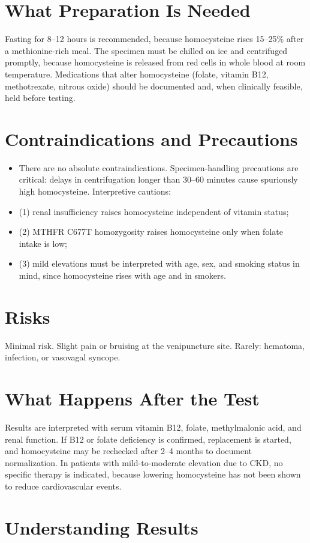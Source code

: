 \section*{What Preparation Is Needed}
Fasting for 8--12 hours is recommended, because homocysteine rises 15--25\% after a methionine-rich meal. The specimen must be chilled on ice and centrifuged promptly, because homocysteine is released from red cells in whole blood at room temperature. Medications that alter homocysteine (folate, vitamin B12, methotrexate, nitrous oxide) should be documented and, when clinically feasible, held before testing.
\section*{Contraindications and Precautions}
\begin{itemize}
  \item There are no absolute contraindications. Specimen-handling precautions are critical: delays in centrifugation longer than 30--60 minutes cause spuriously high homocysteine. Interpretive cautions:
  \item (1) renal insufficiency raises homocysteine independent of vitamin status;
  \item (2) MTHFR C677T homozygosity raises homocysteine only when folate intake is low;
  \item (3) mild elevations must be interpreted with age, sex, and smoking status in mind, since homocysteine rises with age and in smokers.
\end{itemize}
\section*{Risks}
Minimal risk. Slight pain or bruising at the venipuncture site. Rarely: hematoma, infection, or vasovagal syncope.
\section*{What Happens After the Test}
Results are interpreted with serum vitamin B12, folate, methylmalonic acid, and renal function. If B12 or folate deficiency is confirmed, replacement is started, and homocysteine may be rechecked after 2--4 months to document normalization. In patients with mild-to-moderate elevation due to CKD, no specific therapy is indicated, because lowering homocysteine has not been shown to reduce cardiovascular events.
\section*{Understanding Results}
